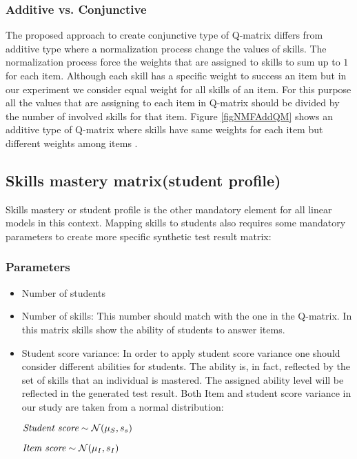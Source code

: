 \subsubsection{Additive vs. Conjunctive}
The proposed approach to create conjunctive type of Q-matrix differs from additive type where a normalization process change the values of skills. The normalization process force the weights that are assigned to skills to sum up to $1$ for each item. Although each skill has a specific weight to success an item but in our experiment we consider equal weight for all skills of an item. For this purpose all the values that are assigning to each item in Q-matrix should be divided by the number of involved skills for that item. Figure \ref{figNMFAddQM} shows an additive type of Q-matrix where skills have same weights for each item but different weights among items . 



\subsection{Skills mastery matrix(student profile)}
\label{Student_Profile}
Skills mastery or student profile is the other mandatory element for all linear models in this context. Mapping skills to students also requires some mandatory parameters to create more specific synthetic test result matrix:
\subsubsection{Parameters}
\begin{itemize}
\item Number of students 
\item Number of skills: This number should match with the one in the Q-matrix. In this matrix skills show the ability of students to answer items.
\item Student score variance:  In order to apply student score variance one should consider different abilities for students. The ability is, in fact, reflected by the set of skills that an individual is mastered. The assigned ability level will be reflected in the generated test result. Both Item and student score variance in our study are taken from a normal distribution:

\begin{center}
$\textit{Student score} \sim \mathcal{N}(\mu_S, s_s)$

$\textit{Item score} \sim \mathcal{N}(\mu_I, s_I)$
\end{center}

\end{itemize}

